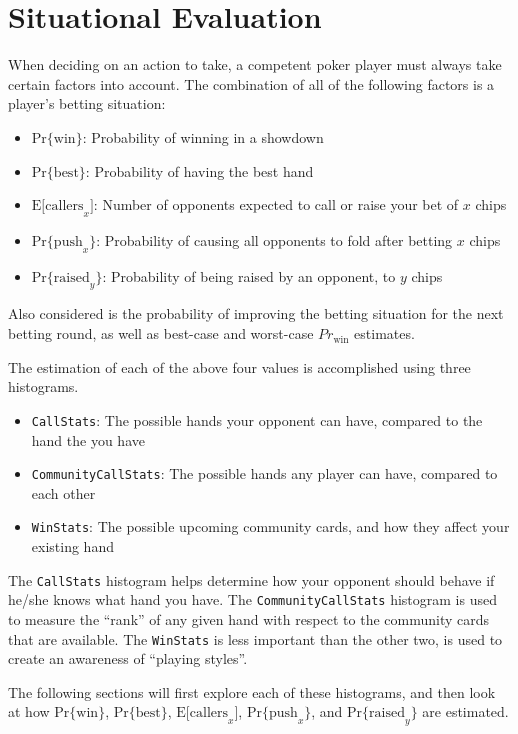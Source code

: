 


\chapter{Situational Evaluation}
\label{sec:SituationalEvaluation}

When deciding on an action to take, a competent poker player must always take certain factors into account.
The combination of all of the following factors is a player's betting situation:
\begin{itemize}
\singlespacing
\item $\mathrm{Pr\{win\}}$: Probability of winning in a showdown
\item $\mathrm{Pr\{best\}}$: Probability of having the best hand
\item $\mathrm{E[callers}_x]$: Number of opponents expected to call or raise your bet of $x$ chips
\item $\mathrm{Pr\{push}_x\}$: Probability of causing all opponents to fold after betting $x$ chips
\item $\mathrm{Pr\{raised}_y\}$: Probability of being raised by an opponent, to $y$ chips
\end{itemize}
Also considered is the probability of improving the betting situation for the next betting round, as well as best-case and worst-case $Pr_{\mathrm{win}}$ estimates.

The estimation of each of the above four values is accomplished using three histograms.
\begin{itemize}
\singlespacing
\item \texttt{CallStats}: The possible hands your opponent can have, compared to the hand the you have
\item \texttt{CommunityCallStats}: The possible hands any player can have, compared to each other
\item \texttt{WinStats}: The possible upcoming community cards, and how they affect your existing hand
\end{itemize}
The \texttt{CallStats} histogram helps determine how your opponent should behave if he/she knows what hand you have.
The \texttt{CommunityCallStats} histogram is used to measure the ``rank'' of any given hand with respect to the community cards that are available.
The \texttt{WinStats} is less important than the other two, is used to create an awareness of ``playing styles''.

The following sections will first explore each of these histograms, and then look at how $\mathrm{Pr\{win\}}$, $\mathrm{Pr\{best\}}$, $\mathrm{E[callers}_x]$, $\mathrm{Pr\{push}_x\}$, and $\mathrm{Pr\{raised}_y\}$ are estimated.

